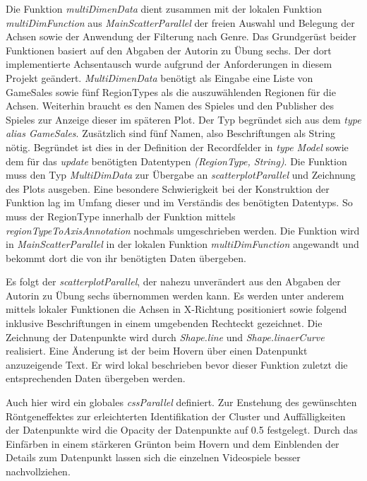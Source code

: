 \documentclass[usegeometry=true]{scrartcl}
\begin{document}
Die Funktion \textit{multiDimenData} dient zusammen mit der lokalen Funktion \textit{multiDimFunction} aus \textit{MainScatterParallel} der freien Auswahl und Belegung der Achsen sowie der Anwendung der Filterung nach Genre. 
Das Grundgerüst beider Funktionen basiert auf den Abgaben der Autorin zu Übung sechs. 
Der dort implementierte Achsentausch wurde aufgrund der Anforderungen in diesem Projekt geändert.
\textit{MultiDimenData} benötigt als Eingabe eine Liste von GameSales sowie fünf RegionTypes als die auszuwählenden Regionen für die Achsen. 
Weiterhin braucht es den Namen des Spieles und den Publisher des Spieles zur Anzeige dieser im späteren Plot. 
Der Typ begründet sich aus dem \textit{type alias GameSales}.
Zusätzlich sind fünf Namen, also Beschriftungen als String nötig. 
Begründet ist dies in der Definition der Recordfelder in \textit{type Model} sowie dem für das \textit{update} benötigten Datentypen \textit{(RegionType, String)}.
Die Funktion muss den Typ \textit{MultiDimData} zur Übergabe an \textit{scatterplotParallel} und Zeichnung des Plots ausgeben. 
Eine besondere Schwierigkeit bei der Konstruktion der Funktion lag im Umfang dieser und im Verständis des benötigten Datentyps. 
So muss der RegionType innerhalb der Funktion mittels \textit{regionTypeToAxisAnnotation} nochmals umgeschrieben werden. 
Die Funktion wird in \textit{MainScatterParallel} in der lokalen Funktion \textit{multiDimFunction} angewandt und bekommt dort die von ihr benötigten Daten übergeben.

Es folgt der \textit{scatterplotParallel}, der nahezu unverändert aus den Abgaben der Autorin zu Übung sechs übernommen werden kann. 
Es werden unter anderem mittels lokaler Funktionen die Achsen in X-Richtung positioniert sowie folgend inklusive Beschriftungen in einem umgebenden Rechteckt gezeichnet.
Die Zeichnung der Datenpunkte wird durch \textit{Shape.line} und \textit{Shape.linaerCurve} realisiert.
Eine Änderung ist der beim Hovern über einen Datenpunkt anzuzeigende Text. Er wird lokal beschrieben bevor dieser Funktion zuletzt die entsprechenden Daten übergeben werden.

Auch hier wird ein globales \textit{cssParallel} definiert.
Zur Enstehung des gewünschten Röntgeneffektes zur erleichterten Identifikation der Cluster und Auffälligkeiten der Datenpunkte wird die Opacity der Datenpunkte auf 0.5 festgelegt.
Durch das Einfärben in einem stärkeren Grünton beim Hovern und dem Einblenden der Details zum Datenpunkt lassen sich die einzelnen Videospiele besser nachvollziehen.
\end{document}
